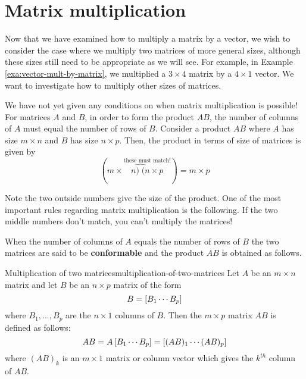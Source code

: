 \section{Matrix multiplication}

Now that we have examined how to multiply a matrix by a vector, we
wish to consider the case where we multiply two matrices of more
general sizes, although these sizes still need to be appropriate as we
will see. For example, in Example \ref{exa:vector-mult-by-matrix}, we
multiplied a $3 \times 4$ matrix by a $4 \times 1$ vector.  We want to
investigate how to multiply other sizes of matrices.

We have not yet given any conditions on when matrix multiplication is
possible!  For matrices $A$ and $B$, in order to form the product
$AB$, the number of columns of $A$ must equal the number of rows of
$B$. Consider a product $AB$ where $A$ has size $m\times n$ and $B$
has size $n \times p$. Then, the product in terms of size of matrices
is given by
\begin{equation*}
  (m\times\overset{\text{these must match!}}{\widehat{n)\;(n}\times p})=m\times p
\end{equation*}

Note the two outside numbers give the size of the product. One of the
most important rules regarding matrix multiplication is the following.
If the two middle numbers don't match, you can't multiply the
matrices!

When the number of columns of $A$ equals the number of rows of $B$ the
two matrices are said to be
\textbf{conformable} and the product
$AB$ is obtained as follows.

\begin{definition}{Multiplication of two matrices}{multiplication-of-two-matrices}
  Let $A$ be an $m\times n$ matrix and let $B$ be an $n\times p$
  matrix of the form
  \begin{equation*}
    B=\left[B_{1} \cdots  B_{p}\right]
  \end{equation*}
  where $B_{1},...,B_{p}$ are the $n\times 1$ columns of $B$. Then the 
  $m\times p$ matrix $AB$ is defined as follows:
  \begin{equation*}
    AB = A \left[B_{1} \cdots  B_{p}\right] =  \left[(A B)_{1} \cdots  (AB)_{p}\right] 
  \end{equation*}
  where $(AB)_{k}$ is an $m\times 1$ matrix or column vector which
  gives the $k^{th}$ column of $AB$. 
\end{definition}

